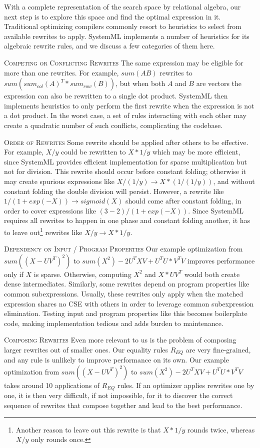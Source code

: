 
With a complete representation of the search space by relational algebra, our
next step is to explore this space and find the optimal expression in it.
Traditional optimizing compilers commonly resort to heuristics to select from
available rewrites to apply. SystemML implements a number of heuristics for its
algebraic rewrite rules, and we discuss a few categories of them here.

\textsc{Competing or Conflicting Rewrites} The same expression may be eligible
for more than one rewrites. For example, $sum(AB)$ rewrites to
$sum(sum_{col}(A)^T*sum_{row}(B))$, but when both $A$ and $B$ are vectors the
expression can also be rewritten to a single dot product. SystemML then
implements heuristics to only perform the first rewrite when the expression is
not a dot product. In the worst case, a set of rules interacting with each other
may create a quadratic number of such conflicts, complicating the codebase.

\textsc{Order of Rewrites} Some rewrite should be applied after others to be
effective. For example, $X/y$ could be rewritten to $X*1/y$ which may be more
efficient, since SystemML provides efficient implementation for sparse
multiplication but not for division. This rewrite should occur before constant
folding; otherwise it may create spurious expressions like $X / (1/y)
\rightarrow X * (1/(1/y))$, and without constant folding the double division
will persist. However, a rewrite like $1/(1 + exp(-X)) \rightarrow sigmoid(X)$
should come after constant folding, in order to cover expressions like $(3-2)/(1
+ exp(-X))$. Since SystemML requires all rewrites to happen in one phase and
constant folding another, it has to leave out\footnote{Another reason to leave
  out this rewrite is that $X*1/y$ rounds twice, whereas $X/y$ only rounds
  once.} rewrites like $X/y \rightarrow X*1/y$.

\textsc{Dependency on Input / Program Properties} Our example optimization from 
$sum((X-UV^T)^2)$  to $sum(X^2) -2U^TXV + U^TU*V^TV$
improves performance only if $X$ is sparse. Otherwise,
computing $X^2$ and $X*UV^T$ would both create dense intermediates. Similarly,
some rewrites depend on program properties like common subexpressions. Usually,
these rewrites only apply when the matched expression shares no CSE with others
in order to leverage common subexpression elimination. Testing input and program
properties like this becomes boilerplate code, making implementation tedious and
adds burden to maintenance.

\textsc{Composing Rewrites} Even more relevant to us is the problem of composing
larger rewrites out of smaller ones. Our equality rules $R_{EQ}$ are very
fine-grained, and any rule is unlikely to improve performance on its own. 
Our example optimization from $sum((X-UV^T)^2)$ to $sum(X^2) - 2U^TXV + U^TU * V^TV$ 
takes around 10 applications of $R_{EQ}$ rules. 
 If an optimizer applies rewrites one by one, it is
then very difficult, if not impossible, for it to discover the correct sequence
of rewrites that compose together and lead to the best performance.

